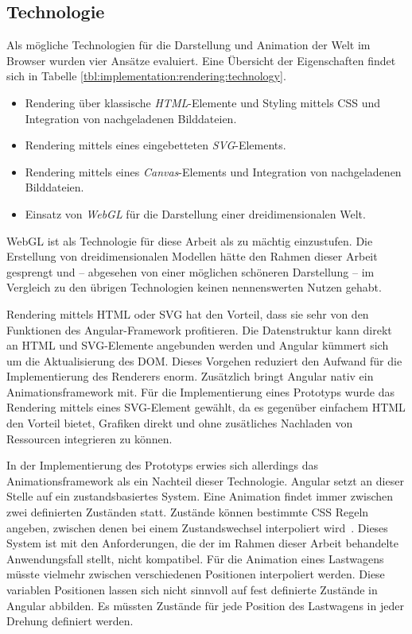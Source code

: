\subsection{Technologie}
\label{sec:implementation:rendering:technology}

Als mögliche Technologien für die Darstellung und Animation der Welt im Browser wurden vier Ansätze evaluiert. Eine Übersicht der Eigenschaften findet sich in Tabelle \ref{tbl:implementation:rendering:technology}.

\begin{itemize}[noitemsep]
  \item Rendering über klassische \emph{HTML}-Elemente und Styling mittels CSS und Integration von nachgeladenen Bilddateien.
  \item Rendering mittels eines eingebetteten \emph{SVG}-Elements.
  \item Rendering mittels eines \emph{Canvas}-Elements und Integration von nachgeladenen Bilddateien.
  \item Einsatz von \emph{WebGL} für die Darstellung einer dreidimensionalen Welt.
\end{itemize}

WebGL ist als Technologie für diese Arbeit als zu mächtig einzustufen. Die Erstellung von dreidimensionalen Modellen hätte den Rahmen dieser Arbeit gesprengt und -- abgesehen von einer möglichen schöneren Darstellung -- im Vergleich zu den übrigen Technologien keinen nennenswerten Nutzen gehabt.

Rendering mittels HTML oder SVG hat den Vorteil, dass sie sehr von den Funktionen des Angular-Framework profitieren. Die Datenstruktur kann direkt an HTML und SVG-Elemente angebunden werden und Angular kümmert sich um die Aktualisierung des DOM. Dieses Vorgehen reduziert den Aufwand für die Implementierung des Renderers enorm. Zusätzlich bringt Angular nativ ein Animationsframework mit. Für die Implementierung eines Prototyps wurde das Rendering mittels eines SVG-Element gewählt, da es gegenüber einfachem HTML den Vorteil bietet, Grafiken direkt und ohne zusätliches Nachladen von Ressourcen integrieren zu können.

In der Implementierung des Prototyps erwies sich allerdings das Animationsframework als ein Nachteil dieser Technologie. Angular setzt an dieser Stelle auf ein zustandsbasiertes System. Eine Animation findet immer zwischen zwei definierten Zuständen statt. Zustände können bestimmte CSS Regeln angeben, zwischen denen bei einem Zustandswechsel interpoliert wird~\cite{angular-animations}. Dieses System ist mit den Anforderungen, die der im Rahmen dieser Arbeit behandelte Anwendungsfall stellt, nicht kompatibel. Für die Animation eines Lastwagens müsste vielmehr zwischen verschiedenen Positionen interpoliert werden. Diese variablen Positionen lassen sich nicht sinnvoll auf fest definierte Zustände in Angular abbilden. Es müssten Zustände für jede Position des Lastwagens in jeder Drehung definiert werden.

